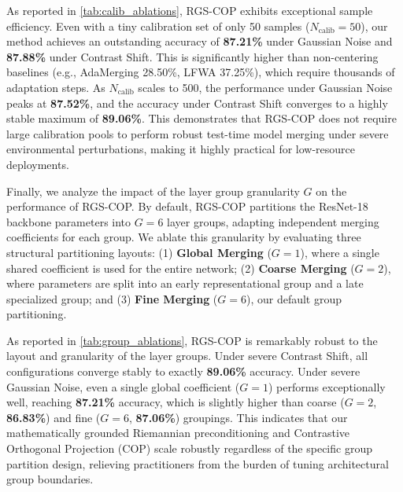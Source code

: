 \documentclass{article}
\theoremstyle{plain}
\theoremstyle{definition}
\theoremstyle{remark}
\begin{document}
As reported in \cref{tab:calib_ablations}, RGS-COP exhibits exceptional sample efficiency. Even with a tiny calibration set of only 50 samples ($N_{\text{calib}}=50$), our method achieves an outstanding accuracy of \textbf{87.21\%} under Gaussian Noise and \textbf{87.88\%} under Contrast Shift. This is significantly higher than non-centering baselines (e.g., AdaMerging 28.50\%, LFWA 37.25\%), which require thousands of adaptation steps. As $N_{\text{calib}}$ scales to 500, the performance under Gaussian Noise peaks at \textbf{87.52\%}, and the accuracy under Contrast Shift converges to a highly stable maximum of \textbf{89.06\%}. This demonstrates that RGS-COP does not require large calibration pools to perform robust test-time model merging under severe environmental perturbations, making it highly practical for low-resource deployments.

Finally, we analyze the impact of the layer group granularity $G$ on the performance of RGS-COP. By default, RGS-COP partitions the ResNet-18 backbone parameters into $G=6$ layer groups, adapting independent merging coefficients for each group. We ablate this granularity by evaluating three structural partitioning layouts: (1) \textbf{Global Merging} ($G=1$), where a single shared coefficient is used for the entire network; (2) \textbf{Coarse Merging} ($G=2$), where parameters are split into an early representational group and a late specialized group; and (3) \textbf{Fine Merging} ($G=6$), our default group partitioning.

As reported in \cref{tab:group_ablations}, RGS-COP is remarkably robust to the layout and granularity of the layer groups. Under severe Contrast Shift, all configurations converge stably to exactly \textbf{89.06\%} accuracy. Under severe Gaussian Noise, even a single global coefficient ($G=1$) performs exceptionally well, reaching \textbf{87.21\%} accuracy, which is slightly higher than coarse ($G=2$, \textbf{86.83\%}) and fine ($G=6$, \textbf{87.06\%}) groupings. This indicates that our mathematically grounded Riemannian preconditioning and Contrastive Orthogonal Projection (COP) scale robustly regardless of the specific group partition design, relieving practitioners from the burden of tuning architectural group boundaries.
\end{document}
